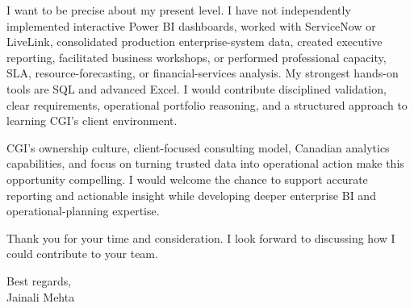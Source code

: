 \documentclass[letterpaper,10pt]{article}
\begin{document}
I want to be precise about my present level. I have not independently implemented interactive Power BI dashboards, worked with ServiceNow or LiveLink, consolidated production enterprise-system data, created executive reporting, facilitated business workshops, or performed professional capacity, SLA, resource-forecasting, or financial-services analysis. My strongest hands-on tools are SQL and advanced Excel. I would contribute disciplined validation, clear requirements, operational portfolio reasoning, and a structured approach to learning CGI's client environment.

CGI's ownership culture, client-focused consulting model, Canadian analytics capabilities, and focus on turning trusted data into operational action make this opportunity compelling. I would welcome the chance to support accurate reporting and actionable insight while developing deeper enterprise BI and operational-planning expertise.

Thank you for your time and consideration. I look forward to discussing how I could contribute to your team.

Best regards,\\[8pt]
Jainali Mehta
\end{document}
